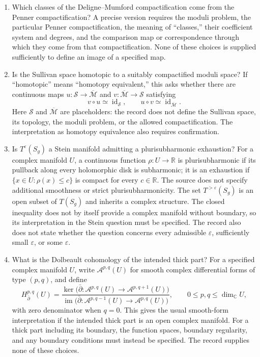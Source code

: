 \documentclass[11pt]{article}
\newcommand{\R}{\mathbb{R}}
\newcommand{\C}{\mathbb{C}}
\begin{document}
\begin{enumerate}
\item Which classes of the Deligne--Mumford compactification come from the Penner compactification? A precise version requires the moduli problem, the particular Penner compactification, the meaning of ``classes,'' their coefficient system and degrees, and the comparison map or correspondence through which they come from that compactification. None of these choices is supplied sufficiently to define an image of a specified map.
\item Is the Sullivan space homotopic to a suitably compactified moduli space? If ``homotopic'' means ``homotopy equivalent,'' this asks whether there are continuous maps \(u:\mathcal S\to\overline{\mathcal M}\) and \(v:\overline{\mathcal M}\to\mathcal S\) satisfying
\[
v\circ u\simeq\operatorname{id}_{\mathcal S},\qquad
u\circ v\simeq\operatorname{id}_{\overline{\mathcal M}}.
\]
Here \(\mathcal S\) and \(\overline{\mathcal M}\) are placeholders: the record does not define the Sullivan space, its topology, the moduli problem, or the allowed compactification. The interpretation as homotopy equivalence also requires confirmation.
\item Is \(T^\varepsilon(S_g)\) a Stein manifold admitting a plurisubharmonic exhaustion? For a complex manifold \(U\), a continuous function \(\rho:U\to\R\) is plurisubharmonic if its pullback along every holomorphic disk is subharmonic; it is an exhaustion if \(\{x\in U:\rho(x)\leq c\}\) is compact for every \(c\in\R\). The source does not specify additional smoothness or strict plurisubharmonicity. The set \(T^{>\varepsilon}(S_g)\) is an open subset of \(T(S_g)\) and inherits a complex structure. The closed inequality does not by itself provide a complex manifold without boundary, so its interpretation in the Stein question must be specified. The record also does not state whether the question concerns every admissible \(\varepsilon\), sufficiently small \(\varepsilon\), or some \(\varepsilon\).
\item What is the Dolbeault cohomology of the intended thick part? For a specified complex manifold \(U\), write \(\mathcal A^{p,q}(U)\) for smooth complex differential forms of type \((p,q)\), and define
\[
H_{\bar\partial}^{p,q}(U)=
\frac{\ker\bigl(\bar\partial:\mathcal A^{p,q}(U)\to\mathcal A^{p,q+1}(U)\bigr)}
{\operatorname{im}\bigl(\bar\partial:\mathcal A^{p,q-1}(U)\to\mathcal A^{p,q}(U)\bigr)},
\qquad 0\leq p,q\leq\dim_{\C}U,
\]
with zero denominator when \(q=0\). This gives the usual smooth-form interpretation if the intended thick part is an open complex manifold. For a thick part including its boundary, the function spaces, boundary regularity, and any boundary conditions must instead be specified. The record supplies none of these choices.
\end{enumerate}
\end{document}
